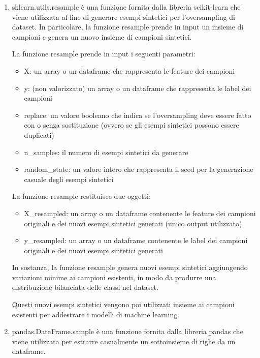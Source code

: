 \begin{enumerate}
\item sklearn.utils.resample è una funzione fornita dalla libreria scikit-learn che viene utilizzata al fine di generare esempi sintetici per l'oversampling di dataset. In particolare, la funzione resample prende in input un insieme di campioni e genera un nuovo insieme di campioni sintetici.

La funzione resample prende in input i seguenti parametri:
\begin{itemize}
\item X: un array o un dataframe che rappresenta le feature dei campioni
\item y: (non valorizzato) un array o un dataframe che rappresenta le label dei campioni
\item replace: un valore booleano che indica se l'oversampling deve essere fatto con o senza sostituzione (ovvero se gli esempi sintetici possono essere duplicati)
\item n\_samples: il numero di esempi sintetici da generare
\item random\_state: un valore intero che rappresenta il seed per la generazione casuale degli esempi sintetici
\end{itemize}
La funzione resample restituisce due oggetti:
\begin{itemize}
\item X\_resampled: un array o un dataframe contenente le feature dei campioni originali e dei nuovi esempi sintetici generati (unico output utilizzato)
\item y\_resampled: un array o un dataframe contenente le label dei campioni originali e dei nuovi esempi sintetici generati
\end{itemize}
In sostanza, la funzione resample genera nuovi esempi sintetici aggiungendo variazioni minime ai campioni esistenti, in modo da produrre una distribuzione bilanciata delle classi nel dataset. 

Questi nuovi esempi sintetici vengono poi utilizzati insieme ai campioni esistenti per addestrare i modelli di machine learning.


\item pandas.DataFrame.sample è una funzione fornita dalla libreria pandas che viene utilizzata per estrarre casualmente un sottoinsieme di righe da un dataframe. 


\end{enumerate}
